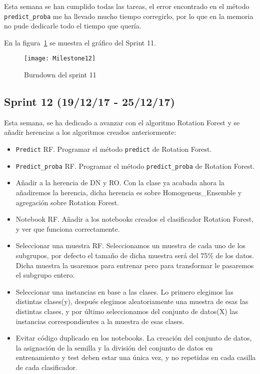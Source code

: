Esta semana se han cumplido todas las tareas, el error encontrado en el método \texttt{predict\_proba} me ha llevado mucho tiempo corregirlo, por lo que en la memoria no pude dedicarle todo el tiempo que quería.

En la figura~\ref{fig:Milestone12} se muestra el gráfico del Sprint 11.

\begin{figure}
\centering
\texttt{[image: Milestone12]}
\caption{Burndown del sprint 11}
\label{fig:Milestone12}
\end{figure}

\subsection{Sprint 12 (19/12/17 - 25/12/17)}
Esta semana, se ha dedicado a avanzar con el algoritmo Rotation Forest y se añadir herencias a los algoritmos creados anteriormente:
\begin{itemize}
\item \texttt{Predict} RF. Programar el método \texttt{predict} de Rotation Forest.
\item \texttt{Predict\_proba} RF. Programar el método \texttt{predict\_proba} de Rotation Forest.
\item Añadir a la herencia de DN y RO. Con la clase ya acabada ahora la añadiremos la herencia, dicha herencia es sobre Homogeneus\_Ensemble y agregación sobre Rotation Forest.
\item Notebook RF. Añadir a los notebooks creados el clasificador Rotation Forest, y ver que funciona correctamente.
\item Seleccionar una muestra RF. Seleccionamos un muestra de cada uno de los subgrupos, por defecto el tamaño de dicha muestra será del 75\% de los datos. Dicha muestra la usaremos para entrenar pero para transformar le pasaremos el subgrupo entero.
\item Seleccionar una instancias en base a las clases. Lo primero elegimos las distintas clases(y), después elegimos aleatoriamente una muestra de esas las distintas clases, y por último seleccionamos del conjunto de datos(X) las instancias correspondientes a la muestra de esas clases.
\item Evitar código duplicado en los notebooks. La creación del conjunto de datos, la asignación de la semilla y la división del conjunto de datos en entrenamiento y test deben estar una única vez, y no repetidas en cada casilla de cada clasificador.
\end{itemize}

